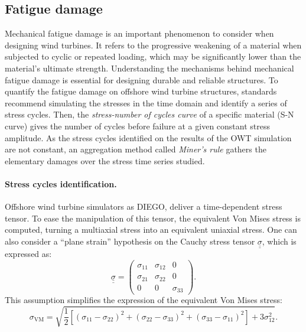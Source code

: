 
\subsection{Fatigue damage}

Mechanical fatigue damage is an important phenomenon to consider when designing wind turbines. 
It refers to the progressive weakening of a material when subjected to cyclic or repeated loading, which may be significantly lower than the material's ultimate strength. 
Understanding the mechanisms behind mechanical fatigue damage is essential for designing durable and reliable structures. 
To quantify the fatigue damage on offshore wind turbine structures, standards \citep{dnv_fatigue_2016} recommend simulating the stresses in the time domain and identify a series of stress cycles. 
Then, the \textit{stress-number of cycles curve} of a specific material (S-N curve) gives the number of cycles before failure at a given constant stress amplitude. 
As the stress cycles identified on the results of the OWT simulation are not constant, an aggregation method called \textit{Miner's rule} gathers the elementary damages over the stress time series studied. 


\paragraph{Stress cycles identification.}
Offshore wind turbine simulators as DIEGO, deliver a time-dependent stress tensor. 
To ease the manipulation of this tensor, the equivalent Von Mises stress is computed, turning a multiaxial stress into an equivalent uniaxial stress. 
One can also consider a ``plane strain'' hypothesis on the Cauchy stress tensor $\underline{\underline{\sigma}}$, which is expressed as:
\begin{equation}
    \underline{\underline{\sigma}} = \begin{pmatrix}
                            \sigma_{11} & \sigma_{12} & 0\\
                            \sigma_{21} & \sigma_{22} & 0\\
                            0 & 0 & \sigma_{33}
                            \end{pmatrix}.
\end{equation}
This assumption simplifies the expression of the equivalent Von Mises stress: 
\begin{equation}
    \sigma _{\mathrm{VM}}=\sqrt{{\frac {1}{2}}\left[(\sigma _{11}-\sigma _{22})^{2}+(\sigma _{22}-\sigma _{33})^{2}+(\sigma _{33}-\sigma _{11})^{2}\right] + 3 \sigma _{12}^{2}}.
\end{equation}

